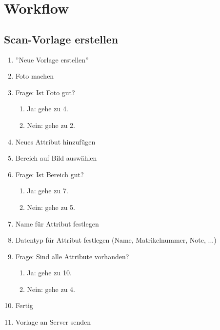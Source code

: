 \documentclass[notables, nomenclature, oneside, 150]{HSMW-Thesis}
\begin{document}
\chapter{Workflow} \label{ch:workflow}
	\section*{Scan-Vorlage erstellen}
	\begin{enumerate}
		\item ''Neue Vorlage erstellen''
		\item Foto machen
		\item Frage: Ist Foto gut?
		\vspace{-5mm}
		\begin{enumerate}
			\item Ja: gehe zu 4.
			\item Nein: gehe zu 2.
		\end{enumerate}
		\item Neues Attribut hinzufügen
		\item Bereich auf Bild auswählen
		\item Frage: Ist Bereich gut?
		\vspace{-5mm}
		\begin{enumerate}
			\item Ja: gehe zu 7.
			\item Nein: gehe zu 5.
		\end{enumerate}
		\item Name für Attribut festlegen
		\item Datentyp für Attribut festlegen (Name, Matrikelnummer, Note, ...)
		\item Frage: Sind alle Attribute vorhanden?
		\vspace{-5mm}
		\begin{enumerate}
			\item Ja: gehe zu 10.
			\item Nein: gehe zu 4.
		\end{enumerate}
		\item Fertig
		\item Vorlage an Server senden
	\end{enumerate}
	
\end{document}

